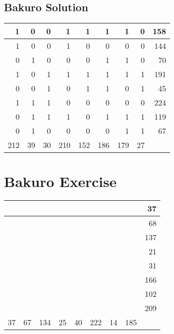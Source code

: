 \documentclass[]{article}
\begin{document}
 \subsection{Bakuro Solution} 
\begin{tabular}{rrrrrrrrr}
\hline
   1 &  0 &  0 &   1 &   1 &   1 &   1 &  0 & 158 \\ \hline
   1 &  0 &  0 &   1 &   0 &   0 &   0 &  0 & 144 \\ \hline
   0 &  1 &  0 &   0 &   0 &   1 &   1 &  0 &  70 \\ \hline
   1 &  0 &  1 &   1 &   1 &   1 &   1 &  1 & 191 \\ \hline
   0 &  0 &  1 &   0 &   1 &   1 &   0 &  1 &  45 \\ \hline
   1 &  1 &  1 &   0 &   0 &   0 &   0 &  0 & 224 \\ \hline
   0 &  1 &  1 &   1 &   0 &   1 &   1 &  1 & 119 \\ \hline
   0 &  1 &  0 &   0 &   0 &   0 &   1 &  1 &  67 \\ \hline
 212 & 39 & 30 & 210 & 152 & 186 & 179 & 27 &     \\ \hline
\hline
\end{tabular}\newpage\section{Bakuro Exercise}\begin{tabular}{rrrrrrrrr}
\hline
    &    &     &    &    &     &    &     &  37 \\ \hline
    &    &     &    &    &     &    &     &  68 \\ \hline
    &    &     &    &    &     &    &     & 137 \\ \hline
    &    &     &    &    &     &    &     &  21 \\ \hline
    &    &     &    &    &     &    &     &  31 \\ \hline
    &    &     &    &    &     &    &     & 166 \\ \hline
    &    &     &    &    &     &    &     & 102 \\ \hline
    &    &     &    &    &     &    &     & 209 \\ \hline
 37 & 67 & 134 & 25 & 40 & 222 & 14 & 185 &     \\ \hline
\hline
\end{tabular}\newpage 
\end{document}
